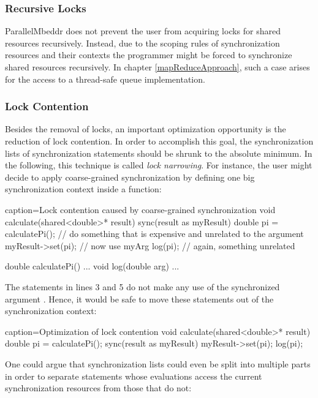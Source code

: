 \subsubsection{Recursive Locks}
ParallelMbeddr does not prevent the user from acquiring locks for shared resources recursively. Instead, due to the scoping rules of synchronization resources and their contexts the programmer might be forced to synchronize shared resources recursively. In chapter \ref{mapReduceApproach}, such a case arises for the access to a thread-safe queue implementation.

\subsubsection{Lock Contention}
Besides the removal of locks, an important optimization opportunity is the reduction of lock contention. In order to accomplish this goal, the synchronization lists of synchronization statements should be shrunk to the absolute minimum. In the following, this technique is called \textit{lock narrowing}. For instance, the user might decide to apply coarse-grained synchronization by defining one big synchronization context inside a function:

\begin{ccode}{caption=Lock contention caused by coarse-grained synchronization}
void calculate(shared<double>* result) {
  sync(result as myResult) {
    double pi = calculatePi(); // do something that is expensive and unrelated to the argument
    myResult->set(pi);         // now use myArg
    log(pi);                   // again, something unrelated
  }
}

double calculatePi() {...}
void log(double arg) {...}
\end{ccode}

The statements in lines 3 and 5 do not make any use of the synchronized argument . Hence, it would be safe to move these statements out of the synchronization context:

\begin{ccode}{caption=Optimization of lock contention}
void calculate(shared<double>* result) {
  double pi = calculatePi();
  sync(result as myResult) { myResult->set(pi); }
  log(pi);
}
\end{ccode}

One could argue that synchronization lists could even be split into multiple parts in order to separate statements whose evaluations access the current synchronization resources from those that do not:

